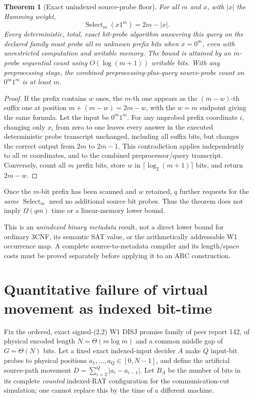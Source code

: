 \documentclass[11pt]{article}
\newtheorem{theorem}{Theorem}
\begin{document}
\begin{theorem}[Exact unindexed source-probe floor]\label{th:select}
For all \(m\) and \(x\), with \(|x|\) the Hamming weight,
\[
  \operatorname{Select}_m(x1^m)=2m-|x|.
\]
Every deterministic, total, exact bit-probe algorithm answering this
query on the declared family must probe all \(m\) unknown prefix bits
when \(x=0^m\), even with unrestricted computation and writable memory.
The bound is attained by an \(m\)-probe sequential count using
\(O(\log(m+1))\) writable bits. With any preprocessing stage, the
\emph{combined} preprocessing-plus-query source-probe count on
\(0^m1^m\) is at least \(m\).
\end{theorem}
\begin{proof}
If the prefix contains \(w\) ones, the \(m\)-th one appears as the
\((m-w)\)-th suffix one at position \(m+(m-w)=2m-w\), with the
\(w=m\) endpoint giving the same formula. Let the input be \(0^m1^m\).
For any unprobed prefix coordinate \(i\), changing only \(x_i\) from
zero to one leaves every answer in the executed deterministic probe
transcript unchanged, including all suffix bits, but changes the
correct output from \(2m\) to \(2m-1\). This contradiction applies
independently to all \(m\) coordinates, and to the combined
preprocessor/query transcript. Conversely, count all \(m\) prefix bits,
store \(w\) in \(\lceil\log_2(m+1)\rceil\) bits, and return \(2m-w\).
\end{proof}

\begin{corollary}
Once the \(m\)-bit prefix has been scanned and \(w\) retained,
\(q\) further requests for the \emph{same} \(\operatorname{Select}_m\)
need no additional source bit probes. Thus the theorem does not
imply \(\Omega(qm)\) time or a linear-memory lower bound.
\end{corollary}
This is an \emph{unindexed binary metadata} result, not a direct
lower bound for ordinary 3CNF, its semantic SAT value, or the
arithmetically addressable W1 occurrence map. A complete
source-to-metadata compiler and its length/space costs must be
proved separately before applying it to an ARC construction.

\section{Quantitative failure of virtual movement as indexed bit-time}
Fix the ordered, exact signed-(2,2) W1 DISJ promise family of peer report
142, of physical encoded length \(N=\Theta(m\log m)\) and a common
middle gap of \(G=\Theta(N)\) bits. Let a fixed exact indexed-input
decider \(A\) make \(Q\) input-bit probes to physical positions
\(a_1,\dots,a_Q\in[0,N-1]\), and define the artificial source-path
movement \(D=\sum_{i=2}^{Q}|a_i-a_{i-1}|\).
Let \(B_A\) be the number of bits in its complete \emph{counted}
indexed-RAT configuration for the communication-cut simulation;
one cannot replace this by the time of a different machine.
\end{document}
